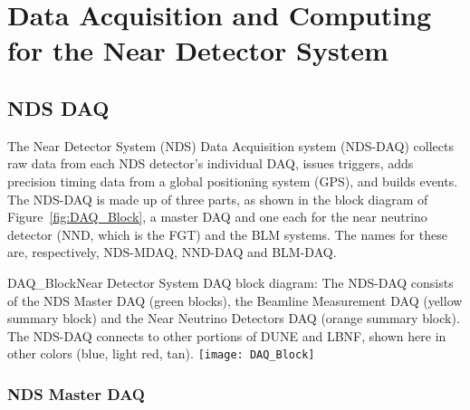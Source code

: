 \chapter{Data Acquisition and Computing for the Near Detector System} %
\label{ch:nd-gdaq}

\section{NDS DAQ}
\label{sec:nd-gdaq-intro}

The Near Detector System (NDS) Data Acquisition system (NDS-DAQ) collects raw data from each NDS detector's
individual DAQ, %
issues %
triggers, adds precision timing 
data from a global positioning system (GPS), and builds events. %
The NDS-DAQ is made up of three parts, as shown in the block diagram of 
Figure~\ref{fig:DAQ_Block}, a master DAQ and one each for the near neutrino detector (NND, which is the FGT) and the BLM systems. The names for these are, respectively, NDS-MDAQ, NND-DAQ and BLM-DAQ.

\begin{cdrfigure}{DAQ_Block}{Near Detector System DAQ block diagram: The NDS-DAQ consists 
of the NDS Master DAQ (green blocks), the Beamline Measurement DAQ (yellow summary 
block) and the Near Neutrino Detectors DAQ (orange summary block).  The 
NDS-DAQ connects to other portions of DUNE and LBNF, shown here in other colors (blue, 
light red, tan).}
\texttt{[image: DAQ\_Block]}
\end{cdrfigure}


\subsection{NDS Master DAQ} %
\label{sec:nd-master-daq}

